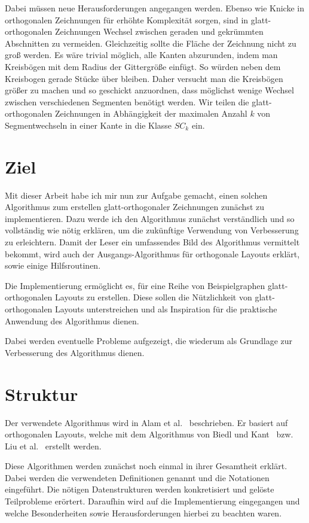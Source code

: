 \documentclass[a4paper]{scrreprt}
\theoremstyle{definition}
\begin{document}
Dabei müssen neue Herausforderungen angegangen werden. Ebenso wie Knicke in orthogonalen Zeichnungen für erhöhte Komplexität sorgen, sind in glatt-orthogonalen Zeichnungen Wechsel zwischen geraden und gekrümmten Abschnitten zu vermeiden. Gleichzeitig sollte die Fläche der Zeichnung nicht zu groß werden. Es wäre trivial möglich, alle Kanten abzurunden, indem man Kreisbögen mit dem Radius der Gittergröße einfügt. So würden neben dem Kreisbogen gerade Stücke über bleiben. Daher versucht man die Kreisbögen größer zu machen und so geschickt anzuordnen, dass möglichst wenige Wechsel zwischen verschiedenen Segmenten benötigt werden. Wir teilen die glatt-orthogonalen Zeichnungen in Abhängigkeit der maximalen Anzahl $k$ von Segmentwechseln in einer Kante in die Klasse $SC_k$ ein. 

\section{Ziel}

Mit dieser Arbeit habe ich mir nun zur Aufgabe gemacht, einen solchen Algorithmus zum erstellen glatt-orthogonaler Zeichnungen zunächst zu implementieren. Dazu werde ich den Algorithmus zunächst verständlich und so vollständig wie nötig erklären, um die zukünftige Verwendung von Verbesserung zu erleichtern. Damit der Leser ein umfassendes Bild des Algorithmus vermittelt bekommt, wird auch der Ausgangs-Algorithmus für orthogonale Layouts erklärt, sowie einige Hilfsroutinen. 

Die Implementierung ermöglicht es, für eine Reihe von Beispielgraphen glatt-orthogonalen Layouts zu erstellen. Diese sollen die Nützlichkeit von glatt-orthogonalen Layouts unterstreichen und als Inspiration für die praktische Anwendung des Algorithmus dienen.

Dabei werden eventuelle Probleme aufgezeigt, die wiederum als Grundlage zur Verbesserung des Algorithmus dienen. 

\section{Struktur}


Der verwendete Algorithmus wird in Alam et al.~\cite{smooth-13} beschrieben. Er basiert auf orthogonalen
Layouts, welche mit dem Algorithmus von Biedl und Kant~\cite{biedl+kant-98} bzw. Liu et al.~\cite{liu+etal-98} erstellt
werden.

Diese Algorithmen werden zunächst noch einmal in ihrer Gesamtheit erklärt. Dabei werden die
verwendeten Definitionen genannt und die Notationen eingeführt. Die nötigen Datenstrukturen
werden konkretisiert und gelöste Teilprobleme erörtert. Daraufhin wird auf die Implementierung eingegangen und welche Besonderheiten sowie Herausforderungen hierbei zu
beachten waren. 
\end{document}
